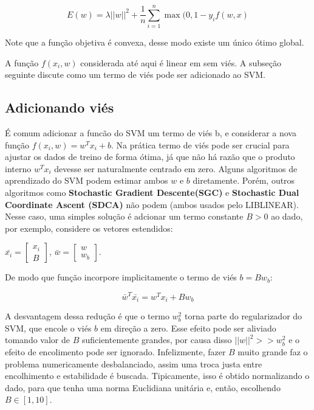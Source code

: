 \documentclass[]{article}
\begin{document}
\begin{equation}
  E(w)  = \lambda||w||^2+\frac{1}{n} \sum_{i=1}^{n}\max(0,1-y_if(w,x)
\end{equation}

Note que a função objetiva é convexa, desse modo existe um único ótimo
global.

A função \(f(x_i,w)\) considerada até aqui é linear em sem viés. A
subseção seguinte discute como um termo de viés pode ser adicionado ao
SVM.

\subsection{Adicionando viés}\label{adicionando-vies}

É comum adicionar a funcão do SVM um termo de viés b, e considerar a
nova função \(f(x_i,w) = w^{T}x_i + b\). Na prática termo de viés pode
ser crucial para ajustar os dados de treino de forma ótima, já que não
há razão que o produto interno \(w^{T}x_i\) devesse ser naturalmente
centrado em zero. Alguns algoritmos de aprendizado do SVM podem estimar
ambos \(w\) e \(b\) diretamente. Porém, outros algoritmos como
\textbf{Stochastic Gradient Descente(SGC)} e \textbf{Stochastic Dual
Coordinate Ascent (SDCA)} não podem (ambos usados pelo LIBLINEAR). Nesse
caso, uma simples solução é adcionar um termo constante \(B > 0\) ao
dado, por exemplo, considere os vetores estendidos:

\(\bar{x_i}=\begin{bmatrix} x_i \\ B \end{bmatrix}\),
\(\bar{w}=\begin{bmatrix} w \\ w_b\end{bmatrix}\).

De modo que função incorpore implicitamente o termo de viés
\(b = Bw_b\):

\begin{equation}
  \bar{w}^T\bar{x_i} = w^Tx_i + Bw_b
\end{equation}

A desvantagem dessa redução é que o termo \(w^2_b\) torna parte do
regularizador do SVM, que encole o viés \(b\) em direção a zero. Esse
efeito pode ser aliviado tomando valor de \(B\) suficientemente grandes,
por causa disso \(||w||^2 >> w^2_b\) e o efeito de encolimento pode ser
ignorado. Infelizmente, fazer \(B\) muito grande faz o problema
numericamente desbalanciado, assim uma troca justa entre encolhimento e
estabilidade é buscada. Tipicamente, isso é obtido normalizando o dado,
para que tenha uma norma Euclidiana unitária e, então, escolhendo
\(B \in [1,10]\).
\end{document}
